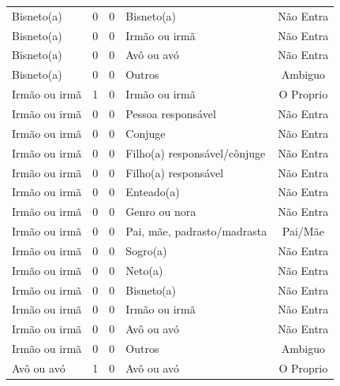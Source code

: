 \documentclass[
	12pt,				%
	openright,			%
	twoside,			%
	a4paper,			%
	english,			%
	french,				%
	spanish,			%
	brazil				%
	]{abntex2}
\begin{document}
\begin{anexosenv}
\begin{longtable}{@{}lcclc@{}}
Bisneto(a)                   & 0         & 0        & Bisneto(a)                   & Não Entra       \\
Bisneto(a)                   & 0         & 0        & Irmão ou irmã                & Não Entra       \\
Bisneto(a)                   & 0         & 0        & Avô ou avó                   & Não Entra       \\
Bisneto(a)                   & 0         & 0        & Outros                       & Ambiguo         \\
Irmão ou irmã                & 1         & 0        & Irmão ou irmã                & O Proprio       \\
Irmão ou irmã                & 0         & 0        & Pessoa responsável           & Não Entra       \\
Irmão ou irmã                & 0         & 0        & Conjuge                      & Não Entra       \\
Irmão ou irmã                & 0         & 0        & Filho(a) responsável/cônjuge & Não Entra       \\
Irmão ou irmã                & 0         & 0        & Filho(a) responsável         & Não Entra       \\
Irmão ou irmã                & 0         & 0        & Enteado(a)                   & Não Entra       \\
Irmão ou irmã                & 0         & 0        & Genro ou nora                & Não Entra       \\
Irmão ou irmã                & 0         & 0        & Pai, mãe, padrasto/madrasta  & Pai/Mãe         \\
Irmão ou irmã                & 0         & 0        & Sogro(a)                     & Não Entra       \\
Irmão ou irmã                & 0         & 0        & Neto(a)                      & Não Entra       \\
Irmão ou irmã                & 0         & 0        & Bisneto(a)                   & Não Entra       \\
Irmão ou irmã                & 0         & 0        & Irmão ou irmã                & Não Entra       \\
Irmão ou irmã                & 0         & 0        & Avô ou avó                   & Não Entra       \\
Irmão ou irmã                & 0         & 0        & Outros                       & Ambiguo         \\
Avô ou avó                   & 1         & 0        & Avô ou avó                   & O Proprio       \\

\end{longtable}
\end{anexosenv}
\end{document}
